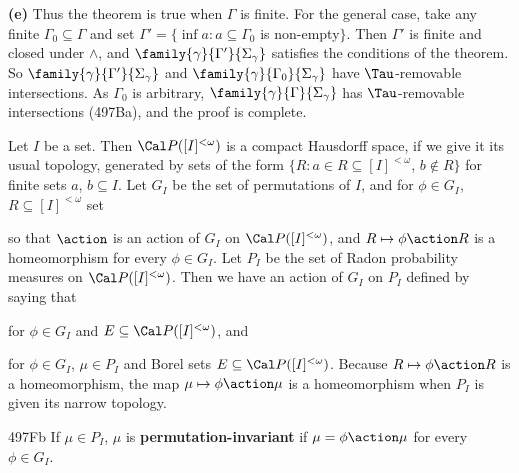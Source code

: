 {\medskip

{\bf (e)} Thus the theorem is true when $\Gamma$ is finite.   For the
general case, take any finite $\Gamma_0\subseteq\Gamma$ and set
$\Gamma'=\{\inf a:a\subseteq\Gamma_0$ is non-empty$\}$.   Then
$\Gamma'$ is finite and closed under $\wedge$,
and $\family{\gamma}{\Gamma'}{\Sigma_{\gamma}}$ satisfies the conditions of
the theorem.   So $\family{\gamma}{\Gamma'}{\Sigma_{\gamma}}$ and
$\family{\gamma}{\Gamma_0}{\Sigma_{\gamma}}$ have $\Tau$-removable
intersections.   As $\Gamma_0$ is arbitrary,
$\family{\gamma}{\Gamma}{\Sigma_{\gamma}}$ has $\Tau$-removable
intersections (497Ba), and the proof is complete.
}%

Let $I$ be a set.   Then $\Cal P([I]^{<\omega})$
is a compact Hausdorff space, if we give it its usual topology, generated
by sets of the form $\{R:a\in R\subseteq[I]^{<\omega}$, $b\notin R\}$ for
finite sets $a$, $b\subseteq I$.
Let $G_I$ be the set of permutations of $I$,
and for $\phi\in G_I$, $R\subseteq[I]^{<\omega}$ set


\noindent so that $\action$ is an action of $G_I$ on
$\Cal P([I]^{<\omega})$, and $R\mapsto\phi\action R$ is a homeomorphism for
every $\phi\in G_I$.
Let $P_I$ be the set of Radon probability measures on
$\Cal P([I]^{<\omega})$.   Then we have an action of $G_I$ on $P_I$ defined
by saying that


\noindent for $\phi\in G_I$ and $E\subseteq\Cal P([I]^{<\omega})$, and


\noindent for $\phi\in G_I$, $\mu\in P_I$ and Borel sets
$E\subseteq\Cal P([I]^{<\omega})$.
Because $R\mapsto\phi\action R$ is a homeomorphism, the map
$\mu\mapsto\phi\action\mu$ is a homeomorphism when $P_I$ is given its
narrow topology.

\spheader 497Fb If $\mu\in P_I$, $\mu$ is
{\bf permutation-invariant} if $\mu=\phi\action\mu$ for every
$\phi\in G_I$.

